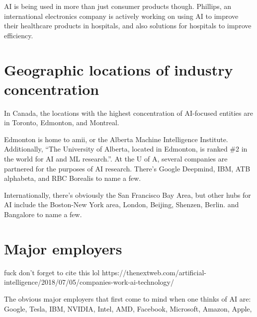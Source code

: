 \documentclass[letterpaper,12pt]{article}
\begin{document}
AI is being used in more than just consumer products though. Phillips,
an international electronics company is actively working on using
AI to improve their healthcare products in hospitals, and also 
solutions for hospitals to improve efficiency.




\section{Geographic locations of industry concentration}

In Canada, the locations with the highest concentration of AI-focused
entities are in Toronto, Edmonton, and Montreal.\cite{investincanada}

Edmonton is home to amii, or the Alberta Machine Intelligence Institute.
Additionally, ``The University of Alberta, located in Edmonton, is ranked \#2 in the world for AI and ML research.''\cite{investincanada}\cite{edmonton.ai}.
At the U of A, several companies are partnered for the purposes of AI research.
There's Google Deepmind, IBM, ATB alphabeta, and RBC Borealis to name a few.

Internationally, there's obviously the San Francisco Bay Area,
but other hubs for AI include
the Boston-New York area,
London,
Beijing,
Shenzen,
Berlin.
and Bangalore to name a few.\cite{aihubs}\cite{aihubsreview}

\section{Major employers}

fuck don't forget to cite this lol https://thenextweb.com/artificial-intelligence/2018/07/05/companies-work-ai-technology/

The obvious major employers that first come to mind when one thinks of AI are:
Google,
Tesla,
IBM,
NVIDIA, Intel, AMD,
Facebook,
Microsoft,
Amazon,
Apple,
\end{document}

